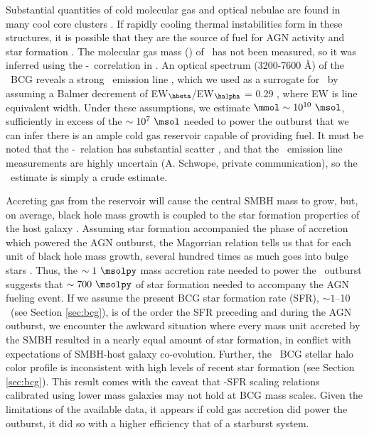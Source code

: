 \documentclass[11pt, preprint]{aastex}
\begin{document}
Substantial quantities of cold molecular gas and optical nebulae are
found in many cool core clusters \citep{crawford99, edge01}. If
rapidly cooling thermal instabilities form in these structures, it is
possible that they are the source of fuel for AGN activity and star
formation \citep[\eg][]{pizzolato05, 2006NewA...12...38S,
  2010MNRAS.408..961P}. The molecular gas mass (\mmol) of \rbs\ has
not been measured, so it was inferred using the
\mmol-\halpha\ correlation in \citet{edge01}. An optical spectrum
(3200-7600 \AA) of the \rbs\ BCG reveals a strong \hbeta\ emission
line \citep{rbs1, rbs2}, which we used as a surrogate for \halpha\ by
assuming a Balmer decrement of EW$_{\hbeta}$/EW$_{\halpha}$ = 0.29
\citep{2006ApJ...642..775M}, where EW is line equivalent width. Under
these assumptions, we estimate $\mmol \sim 10^{10} ~\msol$,
sufficiently in excess of the $\sim 10^7 ~\msol$ needed to power the
outburst that we can infer there is an ample cold gas reservoir
capable of providing fuel. It must be noted that the
\mmol-\halpha\ relation has substantial scatter \citep{salome03}, and
that the \rbs\ emission line measurements are highly uncertain
(A. Schwope, private communication), so the \mmol\ estimate is simply
a crude estimate.

Accreting gas from the reservoir will cause the central SMBH mass to
grow, but, on average, black hole mass growth is coupled to the star
formation properties of the host galaxy
\citep[\eg][]{1995ARA&A..33..581K, 2000ApJ...539L...9F}. Assuming star
formation accompanied the phase of accretion which powered the AGN
outburst, the Magorrian relation \citep{magorrian} tells us that for
each unit of black hole mass growth, several hundred times as much
goes into bulge stars \citep[\eg][]{2004ApJ...604L..89H}. Thus, the
$\sim 1 ~\msolpy$ mass accretion rate needed to power the
\rbs\ outburst suggests that $\sim 700 ~\msolpy$ of star formation
needed to accompany the AGN fueling event. If we assume the present
BCG star formation rate (SFR), $\sim 1$--10 \msolpy\ (see Section
\ref{sec:bcg}), is of the order the SFR preceding and during the AGN
outburst, we encounter the awkward situation where every mass unit
accreted by the SMBH resulted in a nearly equal amount of star
formation, in conflict with expectations of SMBH-host galaxy
co-evolution. Further, the \rbs\ BCG stellar halo color profile is
inconsistent with high levels of recent star formation (see Section
\ref{sec:bcg}). This result comes with the caveat that \mbh-SFR
scaling relations calibrated using lower mass galaxies may not hold at
BCG mass scales. Given the limitations of the available data, it
appears if cold gas accretion did power the outburst, it did so with a
higher efficiency that of a starburst system.
\end{document}
